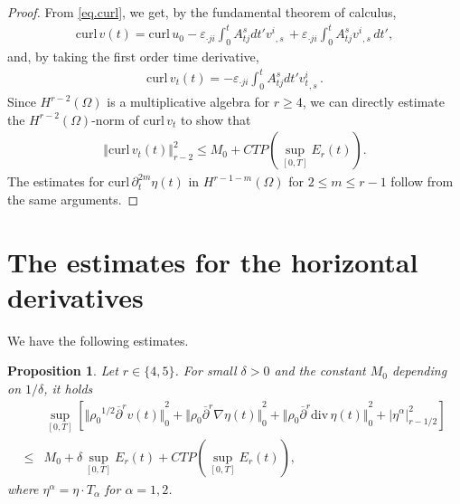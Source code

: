 \documentclass[12pt,twoside,reqno]{amsart}
\numberwithin{equation}{section}
\newtheorem{proposition}[theorem]{Proposition}
\theoremstyle{definition}
\theoremstyle{remark}
\begin{document}
\begin{proof}
From \eqref{eq.curl}, we get, by the fundamental theorem of calculus,
\begin{align*}
  {\mathrm{curl}\,} v(t)={\mathrm{curl}\,} u_0-{\varepsilon}_{\cdot ji}\int_0^t A_{tj}^sdt'{{{v^i}}_{,{s}}\,}+{\varepsilon}_{\cdot ji}\int_0^t A_{tj}^s{{{v^i}}_{,{s}}\,}dt',
\end{align*}
and, by taking the first order time derivative,
\begin{align*}
  {\mathrm{curl}\,} v_t(t)=-{\varepsilon}_{\cdot ji}\int_0^t A_{tj}^sdt'{{{v_t^i}}_{,{s}}\,}.
\end{align*}
Since $H^{r-2}(\Omega)$ is a multiplicative algebra for $r{\geqslant} 4$, we can directly estimate the $H^{r-2}(\Omega)$-norm of ${\mathrm{curl}\,} v_t$ to show that
\begin{align}
  {\Vert{{\mathrm{curl}\,} v_t(t)}\Vert}_{r-2}^2{\leqslant} M_0+CTP(\sup_{[0,T]}E_r(t)).
\end{align}
The estimates for ${\mathrm{curl}\,} {\partial}_t^{2m}\eta(t)$ in $H^{r-1-m}(\Omega)$ for $2{\leqslant} m{\leqslant} r-1$ follow from the same arguments.
\end{proof}

\section{The estimates for the horizontal derivatives}\label{sec.7}

We have the following estimates.

\begin{proposition}\label{prop.hori1}
  Let $r\in\{4,5\}$. For small $\delta>0$ and  the constant $M_0$ depending on $1/\delta$, it holds
  \begin{align*}
    &\sup_{[0,T]}\left[{\Vert{{\rho_0}^{1/2} {\overline{\partial}}^r v(t)}\Vert}_0^2+{\Vert{{\rho_0}  {\overline{\partial}}^r{\nabla} \eta(t)}\Vert}_0^2+{\Vert{{\rho_0}{\overline{\partial}}^r {\mathrm{div}\,} \eta(t)}\Vert}_0^2+{\vert{\eta^\alpha}\vert}_{r-1/2}^2\right]\\
    {\leqslant}& M_0+\delta\sup_{[0,T]}E_r(t)+ CTP(\sup_{[0,T]} E_r(t)),
  \end{align*}
  where $\eta^\alpha=\eta\cdot T_\alpha$ for $\alpha=1,2$.
\end{proposition}
\end{document}
